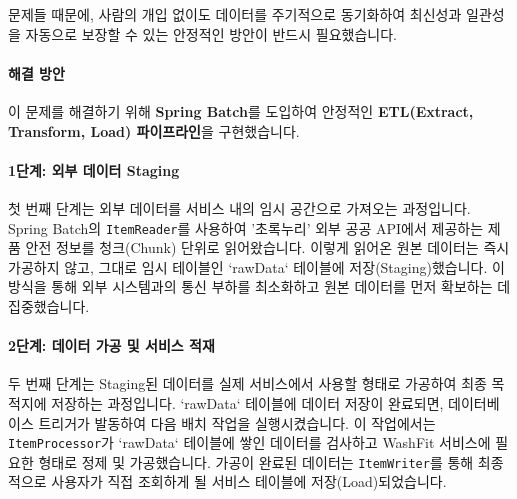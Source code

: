 \documentclass[12pt,a4paper]{article}
\begin{document}
     문제들 때문에, 사람의 개입 없이도 데이터를 주기적으로 동기화하여 최신성과 일관성을 자동으로 보장할 수 있는 안정적인 방안이 반드시 필요했습니다.\\



    \paragraph{해결 방안}

    이 문제를 해결하기 위해 \textbf{Spring Batch}를 도입하여 안정적인 \textbf{ETL(Extract, Transform, Load) 파이프라인}을 구현했습니다. \\



    \paragraph{1단계: 외부 데이터 Staging} \par
    첫 번째 단계는 외부 데이터를 서비스 내의 임시 공간으로 가져오는 과정입니다.
    Spring Batch의 \texttt{ItemReader}를 사용하여 '초록누리' 외부 공공 API에서 제공하는 제품 안전 정보를 청크(Chunk) 단위로 읽어왔습니다. 이렇게 읽어온 원본 데이터는 즉시 가공하지 않고, 그대로 임시 테이블인 `rawData` 테이블에 저장(Staging)했습니다. 이 방식을 통해 외부 시스템과의 통신 부하를 최소화하고 원본 데이터를 먼저 확보하는 데 집중했습니다. \\


    \paragraph{2단계: 데이터 가공 및 서비스 적재} \par
    두 번째 단계는 Staging된 데이터를 실제 서비스에서 사용할 형태로 가공하여 최종 목적지에 저장하는 과정입니다.
    `rawData` 테이블에 데이터 저장이 완료되면, 데이터베이스 트리거가 발동하여 다음 배치 작업을 실행시켰습니다. 이 작업에서는 \texttt{ItemProcessor}가 `rawData` 테이블에 쌓인 데이터를 검사하고 WashFit 서비스에 필요한 형태로 정제 및 가공했습니다. 가공이 완료된 데이터는 \texttt{ItemWriter}를 통해 최종적으로 사용자가 직접 조회하게 될 서비스 테이블에 저장(Load)되었습니다.
\end{document}
